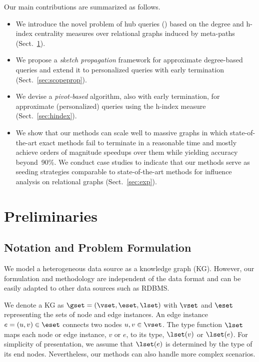Our main contributions are summarized as follows.
\begin{itemize}[leftmargin=*]
  \item We introduce the novel problem of hub queries (\ced) based on the degree and h-index centrality measures over relational graphs induced by meta-paths (Sect.~\ref{sec:preli}).
  \item We propose a \emph{sketch propagation} framework for approximate degree-based \ced queries and extend it to personalized \ced queries with early termination (Sect.~\ref{sec:scopeprop}).
  \item We devise a \emph{pivot-based} algorithm, also with early termination, for approximate (personalized) \ced queries using the h-index measure (Sect.~\ref{sec:hindex}).
  \item We show that our methods can scale well to massive graphs in which state-of-the-art exact methods fail to terminate in a reasonable time and mostly achieve orders of magnitude speedups over them while yielding accuracy beyond~90\%. We conduct case studies to indicate that our methods serve as seeding strategies comparable to state-of-the-art methods for influence analysis on relational graphs (Sect.~\ref{sec:exp}).
\end{itemize}


\section{Preliminaries}
\label{sec:preli}

\subsection{Notation and Problem Formulation}

We model a heterogeneous data source as a knowledge graph (KG).
However, our formulation and methodology are independent of the data format and can be easily adapted to other data sources such as RDBMS.

We denote a KG as $\gset=(\vset, \eset, \lset)$ with $\vset$ and $\eset$ representing the sets of node and edge instances.
An edge instance $e = (u, v) \in \eset$ connects two nodes $u, v \in \vset$.
The type function $\lset$ maps each node or edge instance, $v$ or $e$, to its type, $\lset(v)$ or $\lset(e)$.
For simplicity of presentation, we assume that $\lset(e)$ is determined by the type of its end nodes.
Nevertheless, our methods can also handle more complex scenarios.


